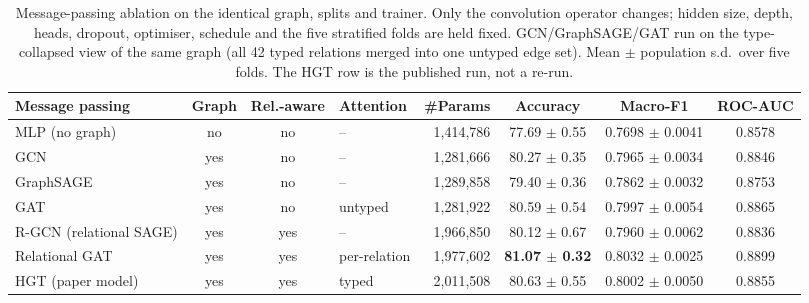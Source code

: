 \begin{table}[!htbp]
\centering
\caption{Message-passing ablation on the identical graph, splits and trainer. Only the convolution operator changes; hidden size, depth, heads, dropout, optimiser, schedule and the five stratified folds are held fixed. GCN/GraphSAGE/GAT run on the type-collapsed view of the same graph (all 42 typed relations merged into one untyped edge set). Mean $\pm$ population s.d.\ over five folds. The HGT row is the published run, not a re-run.}
\label{tab:gnn-architecture-ablation}
\setlength{\tabcolsep}{4pt}
\renewcommand{\arraystretch}{1.05}
\scriptsize
\begin{adjustbox}{max width=\textwidth}
\begin{tabular}{l c c l r c c c}
\toprule
Message passing & Graph & Rel.-aware & Attention & \#Params & Accuracy & Macro-F1 & ROC-AUC \\
\midrule
MLP (no graph) & no & no & -- & 1,414,786 & 77.69 $\pm$ 0.55 & 0.7698 $\pm$ 0.0041 & 0.8578 \\
GCN & yes & no & -- & 1,281,666 & 80.27 $\pm$ 0.35 & 0.7965 $\pm$ 0.0034 & 0.8846 \\
GraphSAGE & yes & no & -- & 1,289,858 & 79.40 $\pm$ 0.36 & 0.7862 $\pm$ 0.0032 & 0.8753 \\
GAT & yes & no & untyped & 1,281,922 & 80.59 $\pm$ 0.54 & 0.7997 $\pm$ 0.0054 & 0.8865 \\
R-GCN (relational SAGE) & yes & yes & -- & 1,966,850 & 80.12 $\pm$ 0.67 & 0.7960 $\pm$ 0.0062 & 0.8836 \\
Relational GAT & yes & yes & per-relation & 1,977,602 & \textbf{81.07 $\pm$ 0.32} & 0.8032 $\pm$ 0.0025 & 0.8899 \\
\midrule
HGT (paper model) & yes & yes & typed & 2,011,508 & 80.63 $\pm$ 0.55 & 0.8002 $\pm$ 0.0050 & 0.8855 \\
\bottomrule
\end{tabular}
\end{adjustbox}
\end{table}
